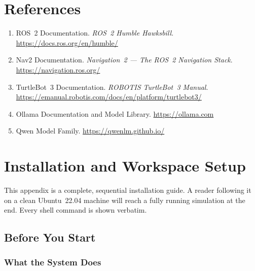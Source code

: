 \documentclass[12pt,a4paper]{report}
\begin{document}
\chapter*{References}

\begin{enumerate}[leftmargin=2em]
  \item ROS~2 Documentation. \emph{ROS~2 Humble Hawksbill}.
        \url{https://docs.ros.org/en/humble/}
  \item Nav2 Documentation. \emph{Navigation~2 — The ROS~2 Navigation Stack}.
        \url{https://navigation.ros.org/}
  \item TurtleBot~3 Documentation. \emph{ROBOTIS TurtleBot~3 Manual}.
        \url{https://emanual.robotis.com/docs/en/platform/turtlebot3/}
  \item Ollama Documentation and Model Library. \url{https://ollama.com}
  \item Qwen Model Family. \url{https://qwenlm.github.io/}
\end{enumerate}

\appendix

\chapter{Installation and Workspace Setup}
\label{app:setup}

This appendix is a complete, sequential installation guide.
A reader following it on a clean Ubuntu~22.04 machine will reach a fully
running simulation at the end.  Every shell command is shown verbatim.

\section{Before You Start}

\subsection*{What the System Does}
\end{document}
